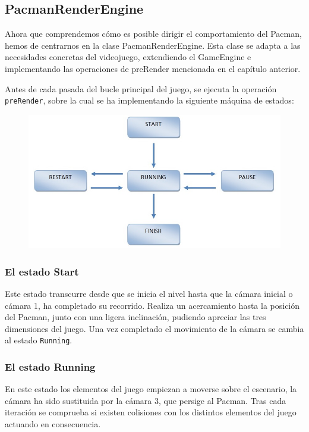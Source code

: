 \subsection{PacmanRenderEngine}

Ahora que comprendemos cómo es posible dirigir el comportamiento del Pacman, hemos de centrarnos en la clase PacmanRenderEngine. Esta clase se adapta a las necesidades concretas del videojuego, extendiendo el GameEngine e implementando las operaciones de preRender mencionada en el capítulo anterior.
\newline

Antes de cada pasada del bucle principal del juego, se ejecuta la operación \texttt{preRender}, sobre la cual se ha implementando la siguiente máquina de estados:
\begin{figure}[h]
	\centering	
	\includegraphics[width=12.5cm]{img/PacmanEngineRenderStates.jpg}
\end{figure}

\subsubsection{El estado Start}

Este estado transcurre desde que se inicia el nivel hasta que la cámara inicial o cámara 1, ha completado su recorrido. Realiza un acercamiento hasta la posición del Pacman, junto con una ligera inclinación, pudiendo apreciar las tres dimensiones del juego. Una vez completado el movimiento de la cámara se cambia al estado \texttt{Running}.
 
\subsubsection{El estado Running}
En este estado los elementos del juego empiezan a moverse sobre el escenario, la cámara ha sido sustituida por la cámara 3, que persige al Pacman. Tras cada iteración se comprueba si existen colisiones con los distintos elementos del juego actuando en consecuencia.
\newline

